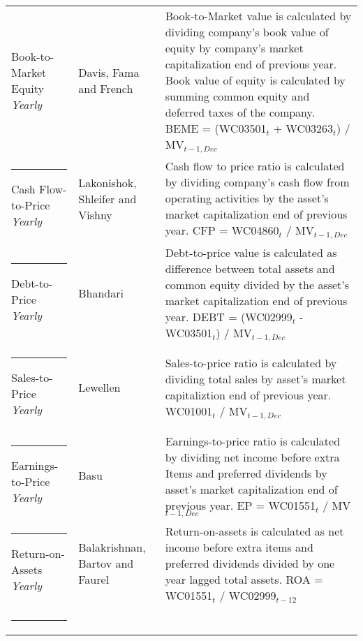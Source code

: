 \documentclass{article}
\begin{document}
{{\begin{xltabular}{\textwidth}{ >{\raggedright\arraybackslash}p{0.23\textwidth} >{\raggedright\arraybackslash}p{0.2\textwidth} X}
Book-to-Market Equity \newline \emph{Yearly} 	& Davis, Fama and French \citeyear{Davis2000}	&  Book-to-Market value is calculated by dividing company's book value of equity by company's market capitalization end of previous year. Book value of equity is calculated by summing common equity and deferred taxes of the company. \newline BEME = (WC03501$_{t}$ + WC03263$_{t}$) /  MV$_{t-1, Dec}$\\ \rule{-1ex}{3ex}
Cash Flow-to-Price \newline \emph{Yearly}	& Lakonishok, Shleifer and Vishny  \citeyear{Lakonishok1994} 	& Cash flow to price ratio is calculated by dividing company's cash flow from operating activities by the asset's market capitalization end of previous year. \newline CFP = WC04860$_{t}$ / MV$_{t-1, Dec}$\\ \rule{-1ex}{3ex}
Debt-to-Price \newline \emph{Yearly}			& Bhandari \citeyear{Bhandari1988}				& Debt-to-price value is calculated as difference between total assets and common equity divided by the asset's market capitalization end of previous year. \newline DEBT = (WC02999$_{t}$ - WC03501$_{t}$) / MV$_{t-1, Dec}$\\ \rule{-1ex}{3ex}
Sales-to-Price 	\newline \emph{Yearly}		& Lewellen \citeyear{Lewellen2015}				& Sales-to-price ratio is calculated by dividing total sales by asset's market capitaliztion end of previous year. \newline WC01001$_{t}$ / MV$_{t-1, Dec}$ \\ \rule{-1ex}{3ex}
Earnings-to-Price \newline \emph{Yearly}		& Basu \citeyear{Basu1977}					& Earnings-to-price ratio is calculated by dividing net income before extra Items and preferred dividends by asset's market capitalization end of previous year. \newline EP = WC01551$_{t}$ / MV$_{t-1, Dec}$ \\ \rule{-1ex}{3ex}
Return-on-Assets \newline \emph{Yearly}		& Balakrishnan, Bartov and Faurel \citeyear{BALAKRISHNAN2010}	& Return-on-assets is calculated as net income before extra items and preferred dividends divided by one year lagged total assets. \newline ROA = WC01551$_{t}$ / WC02999$_{t-12}$ \\ \rule{-1ex}{3ex}

\end{xltabular}}}
\end{document}
